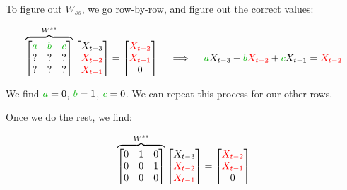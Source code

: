         To figure out $W_{ss}$, we go row-by-row, and figure out the correct values:

        \begin{equation}
            \overbrace{
                \begin{bmatrix}
                    \grn{a} & \grn{b} & \grn{c} \\
                    ? & ? & ? \\
                    ? & ? & ?
                \end{bmatrix}
            }^{W^{ss}}
            \begin{bmatrix}
                X_{t-3} \\ \red{X_{t-2}} \\ \red{X_{t-1}}
            \end{bmatrix} 
            = 
            \begin{bmatrix}
                \red{X_{t-2}} \\ \red{X_{t-1}} \\ 0
            \end{bmatrix}
            \quad \implies \quad 
            \grn{a}X_{t-3}+\grn{b}\red{X_{t-2}}+ \grn{c}X_{t-1} = \red{X_{t-2}}
        \end{equation}

        We find $\grn{a}=0$, $\grn{b}=1$, $\grn{c}=0$. We can repeat this process for our other rows.

        Once we do the rest, we find:

        \begin{equation}
            \overbrace{
                \begin{bmatrix}
                    0 & 1 & 0 \\
                    0 & 0 & 1 \\
                    0 & 0 & 0
                \end{bmatrix}
            }^{W^{ss}}
            \begin{bmatrix}
                X_{t-3} \\ \textcolor{red}{X_{t-2}} \\ \textcolor{red}{X_{t-1}}
            \end{bmatrix} 
            = 
            \begin{bmatrix}
                \textcolor{red}{X_{t-2}} \\ \textcolor{red}{X_{t-1}} \\ 0
            \end{bmatrix}
        \end{equation}

